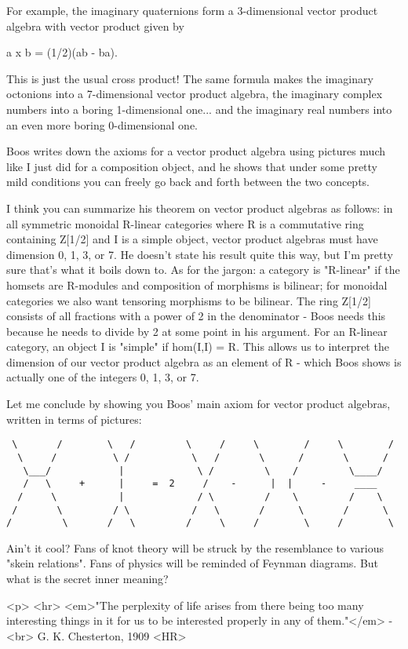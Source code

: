 For example, the imaginary quaternions form a 3-dimensional vector 
product algebra with vector product given by

a x b = (1/2)(ab - ba).

This is just the usual cross product!  The same formula makes the 
imaginary octonions into a 7-dimensional vector product algebra, 
the imaginary complex numbers into a boring 1-dimensional one... 
and the imaginary real numbers into an even more boring 0-dimensional 
one.

Boos writes down the axioms for a vector product algebra using pictures 
much like I just did for a composition object, and he shows that under 
some pretty mild conditions you can freely go back and forth between 
the two concepts.  

I think you can summarize his theorem on vector product algebras as
follows: in all symmetric monoidal R-linear categories where R is a
commutative ring containing Z[1/2] and I is a simple object, vector
product algebras must have dimension 0, 1, 3, or 7.  He doesn't state
his result quite this way, but I'm pretty sure that's what it boils down
to.  As for the jargon: a category is "R-linear" if the
homsets are R-modules and composition of morphisms is bilinear; for
monoidal categories we also want tensoring morphisms to be bilinear.
The ring Z[1/2] consists of all fractions with a power of 2 in the
denominator - Boos needs this because he needs to divide by 2 at some
point in his argument.  For an R-linear category, an object I is
"simple" if hom(I,I) = R.  This allows us to interpret the
dimension of our vector product algebra as an element of R - which Boos
shows is actually one of the integers 0, 1, 3, or 7.

Let me conclude by showing you Boos' main axiom for vector
product algebras, written in terms of pictures:

\begin{verbatim}
 \       /        \   /         \     /     \        /     \        /
  \     /          \ /           \   /       \      /       \      /
   \___/            |             \ /         \    /         \____/ 
   /   \     +      |     =  2     /    -      |  |     -     ____    
  /     \           |             / \         /    \         /    \
 /       \         / \           /   \       /      \       /      \
/         \       /   \         /     \     /        \     /        \
\end{verbatim}
    
Ain't it cool?  Fans of knot theory will be struck by the resemblance
to various "skein relations".  Fans of physics will be reminded of
Feynman diagrams.  But what is the secret inner meaning?    


<p> <hr>
<em>"The perplexity of life arises from there being too many
interesting things in it for us to be interested properly
in any of them."</em> - <br> G. K. Chesterton, 1909
<HR>



